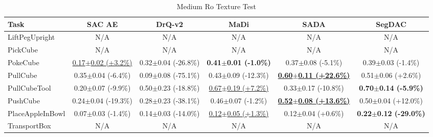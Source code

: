\begin{table}[htbp]
\centering
\scriptsize
\caption{Medium Ro Texture Test}
\label{tab:appendix_rotexturetest_medium}
\begin{adjustbox}{max width=\textwidth}
\begin{tabular}{l*{5}{c}}
\toprule
\textbf{Task} & \textbf{SAC AE} & \textbf{DrQ-v2} & \textbf{MaDi} & \textbf{SADA} & \textbf{SegDAC} \\
\midrule
LiftPegUpright & N/A & N/A & N/A & N/A & N/A \\
PickCube & N/A & N/A & N/A & N/A & N/A \\
PokeCube & \underline{0.17$\pm$0.02 \scriptsize{(+3.2\%)}} & 0.32$\pm$0.04 \scriptsize{(-26.8\%)} & \textbf{0.41$\pm$0.01 \scriptsize{(-1.0\%)}} & 0.37$\pm$0.08 \scriptsize{(-5.1\%)} & 0.39$\pm$0.03 \scriptsize{(-1.4\%)} \\
PullCube & 0.35$\pm$0.04 \scriptsize{(-6.4\%)} & 0.09$\pm$0.08 \scriptsize{(-75.1\%)} & 0.43$\pm$0.09 \scriptsize{(-12.3\%)} & \textbf{\underline{0.60$\pm$0.11 \scriptsize{(+22.6\%)}}} & 0.51$\pm$0.06 \scriptsize{(+2.6\%)} \\
PullCubeTool & 0.20$\pm$0.07 \scriptsize{(-9.9\%)} & 0.50$\pm$0.23 \scriptsize{(-18.8\%)} & \underline{0.67$\pm$0.19 \scriptsize{(+7.2\%)}} & 0.33$\pm$0.17 \scriptsize{(-10.8\%)} & \textbf{0.70$\pm$0.14 \scriptsize{(-5.9\%)}} \\
PushCube & 0.24$\pm$0.04 \scriptsize{(-19.3\%)} & 0.28$\pm$0.23 \scriptsize{(-38.1\%)} & 0.46$\pm$0.07 \scriptsize{(-1.2\%)} & \textbf{\underline{0.52$\pm$0.08 \scriptsize{(+13.6\%)}}} & 0.50$\pm$0.04 \scriptsize{(+12.0\%)} \\
PlaceAppleInBowl & 0.07$\pm$0.03 \scriptsize{(-1.4\%)} & 0.14$\pm$0.03 \scriptsize{(-14.0\%)} & \underline{0.12$\pm$0.05 \scriptsize{(+1.3\%)}} & 0.12$\pm$0.04 \scriptsize{(+0.6\%)} & \textbf{0.22$\pm$0.12 \scriptsize{(-29.0\%)}} \\
TransportBox & N/A & N/A & N/A & N/A & N/A \\
\bottomrule
\end{tabular}
\end{adjustbox}
\end{table}

